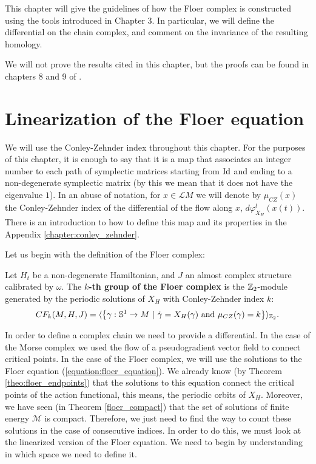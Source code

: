 This chapter will give the guidelines of how the Floer complex is constructed using the tools introduced in Chapter 3. In particular, we will define the differential on the chain complex, and comment on the invariance of the resulting homology.

We will not prove the results cited in this chapter, but the proofs can be found in chapters 8 and 9 of \cite{audin2014morse}.

\section{Linearization of the Floer equation}

We will use the Conley-Zehnder index throughout this chapter. For the purposes of this chapter, it is enough to say that it is a map that associates an integer number to each path of symplectic matrices starting from $\mathrm{Id}$ and ending to a non-degenerate symplectic matrix (by this we mean that it does not have the eigenvalue $1$). In an abuse of notation, for $x \in \mathcal{L}M$ we will denote by $\mu_{CZ}(x)$ the Conley-Zehnder index of the differential of the flow along $x$, $d\varphi_{X_H}^t(x(t))$. There is an introduction to how to define this map and its properties in the Appendix \ref{chapter:conley_zehnder}.

Let us begin with the definition of the Floer complex:

\begin{deff} \label{deff:floer_complex}
Let $H_t$ be a non-degenerate Hamiltonian, and $J$ an almost complex structure calibrated by $\omega$. The {\bf $k$-th group of the Floer complex} is the $\mathbb{Z}_2$-module generated by the periodic solutions of $X_H$ with Conley-Zehnder index $k$:
\[CF_k(M,H,J) = \langle \left\{ \gamma : \mathbb{S}^1 \rightarrow M \ | \ \dot{\gamma} = X_H(\gamma) \text{ and } \mu_{CZ}(\gamma) = k \right\} \rangle_{\mathbb{Z}_2} .\]
\end{deff}

In order to define a complex chain we need to provide a differential. In the case of the Morse complex we used the flow of a pseudogradient vector field to connect critical points. In the case of the Floer complex, we will use the solutions to the Floer equation (\ref{equation:floer_equation}). We already know (by Theorem \ref{theo:floer_endpoints}) that the solutions to this equation connect the critical points of the action functional, this means, the periodic orbits of $X_H$. Moreover, we have seen (in Theorem \ref{floer_compact}) that the set of solutions of finite energy $\mathcal{M}$ is compact. Therefore, we just need to find the way to count these solutions in the case of consecutive indices. In order to do this, we must look at the linearized version of the Floer equation. We need to begin by understanding in which space we need to define it.

